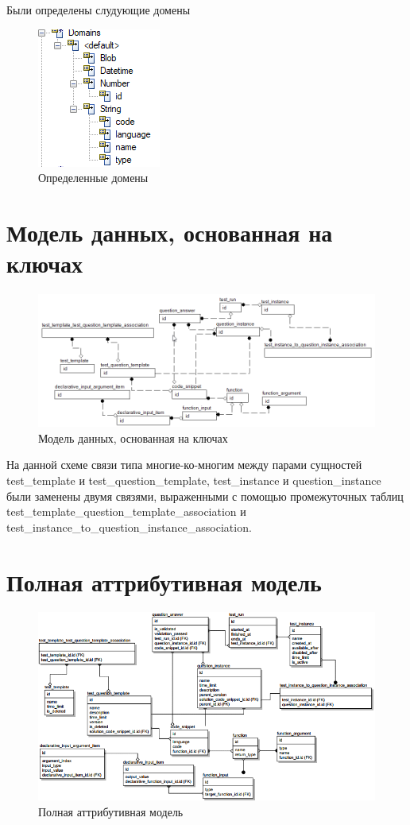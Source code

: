 \documentclass{article}
\begin{document}
Были определены слудующие домены
\begin{figure}[H]
	\includegraphics[center]{domains.png}
	\caption{Определенные домены}
\end{figure}
\section{Модель данных, основанная на ключах}
\begin{figure}[H]
\includegraphics[width=\textwidth, center]{key_based.png}
\caption{Модель данных, основанная на ключах}
\end{figure}
На данной схеме связи типа многие-ко-многим между парами
сущностей test\_template и test\_question\_template, test\_instance и
question\_instance были заменены двумя связями, выраженными
с помощью промежуточных таблиц test\_template\_question\_template\_association
и test\_instance\_to\_question\_instance\_association.

\section{Полная аттрибутивная модель}
\begin{figure}[H]
	\includegraphics[width=\textwidth, center]{attr_based.png}
	\caption{Полная аттрибутивная модель}
\end{figure}
\end{document}
